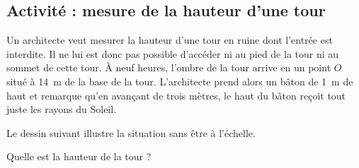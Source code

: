 
\subsection*{Activité : mesure de la hauteur d'une tour}

Un architecte veut mesurer la hauteur d'une tour en ruine dont l'entrée est interdite. Il ne lui est donc pas possible d'accéder ni au pied de la tour ni au sommet de cette tour. À neuf heures, l'ombre de la tour arrive en un point \( O\) situé à \SI{14}{\meter} de la base de la tour. L'architecte prend alors un bâton de \SI{1}{\meter} de haut et remarque qu'en avançant de trois mètres, le haut du bâton reçoit tout juste les rayons du Soleil.

Le dessin suivant illustre la situation sans être à l'échelle.

\begin{center}
   
\end{center}

Quelle est la hauteur de la tour ?
